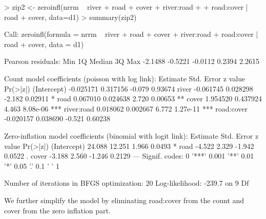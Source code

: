 \documentclass{article}
\begin{document}
\begin{Schunk}
\begin{Sinput}
> zip2 <- zeroinfl(nrrm ~ river + road + cover + river:road +
+                    road:cover | road + cover, data=d1)
> summary(zip2)
\end{Sinput}
\begin{Soutput}
Call:
zeroinfl(formula = nrrm ~ river + road + cover + river:road + road:cover | 
    road + cover, data = d1)

Pearson residuals:
    Min      1Q  Median      3Q     Max 
-2.1488 -0.5221 -0.0112  0.2394  2.2615 

Count model coefficients (poisson with log link):
             Estimate Std. Error z value Pr(>|z|)    
(Intercept) -0.025171   0.317156  -0.079  0.93674    
river       -0.061745   0.028298  -2.182  0.02911 *  
road         0.067010   0.024638   2.720  0.00653 ** 
cover        1.954520   0.437924   4.463 8.08e-06 ***
river:road   0.018062   0.002667   6.772 1.27e-11 ***
road:cover  -0.020157   0.038690  -0.521  0.60238    

Zero-inflation model coefficients (binomial with logit link):
            Estimate Std. Error z value Pr(>|z|)  
(Intercept)   24.088     12.251   1.966   0.0493 *
road          -4.522      2.329  -1.942   0.0522 .
cover         -3.188      2.560  -1.246   0.2129  
---
Signif. codes:  0 '***' 0.001 '**' 0.01 '*' 0.05 '.' 0.1 ' ' 1 

Number of iterations in BFGS optimization: 20 
Log-likelihood: -239.7 on 9 Df
\end{Soutput}
\end{Schunk}

We further simplify the model by eliminating road:cover from the count and cover from the zero inflation part.
\end{document}
